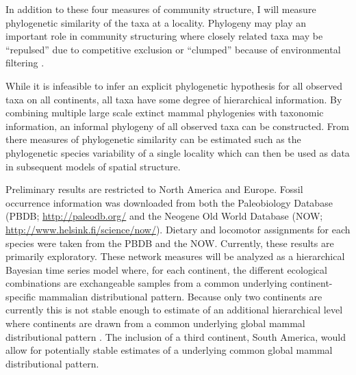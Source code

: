 \documentclass[11pt,letterpaper]{article}
\begin{document}
In addition to these four measures of community structure, I will measure phylogenetic similarity of the taxa at a locality. Phylogeny may play an important role in community structuring where closely related taxa may be ``repulsed'' due to competitive exclusion or ``clumped'' because of environmental filtering \citep{Webb2002}. 

While it is infeasible to infer an explicit phylogenetic hypothesis for all observed taxa on all continents, all taxa have some degree of hierarchical information. By combining multiple large scale extinct mammal phylogenies with taxonomic information, an informal phylogeny of all observed taxa can be constructed. From there measures of phylogenetic similarity can be estimated such as the phylogenetic species variability of a single locality \citep{Helmus2007a} which can then be used as data in subsequent models of spatial structure.

Preliminary results are restricted to North America and Europe. Fossil occurrence information was downloaded from both the Paleobiology Database (PBDB; \url{http://paleodb.org/} and the Neogene Old World Database (NOW; \url{http://www.helsink.fi/science/now/}). Dietary and locomotor assignments for each species were taken from the PBDB and the NOW. Currently, these results are primarily exploratory. These network measures will be analyzed as a hierarchical Bayesian time series model where, for each continent, the different ecological combinations are exchangeable samples from a common underlying continent-specific mammalian distributional pattern. Because only two continents are currently this is not stable enough to estimate of an additional hierarchical level where continents are drawn from a common underlying global mammal distributional pattern \citep{Gelman2013d}. The inclusion of a third continent, South America, would allow for potentially stable estimates of a underlying common global mammal distributional pattern. %

\end{document}
